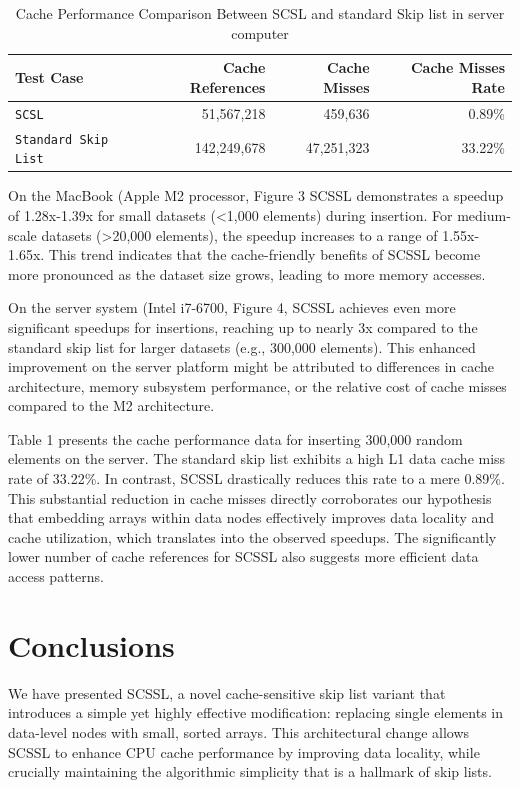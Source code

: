 \documentclass[sigconf, nonacm, letterpaper,top=2cm,bottom=2cm,left=3cm,right=3cm,marginparwidth=1.75cm]{acmart}
\begin{document}
\begin{table}[t]
\begin{tabular}{lrrr}
\toprule
Test Case & Cache References & Cache Misses & Cache Misses Rate \\
\midrule
\verb|SCSL| & 51,567,218 & 459,636 & 0.89\% \\
\verb|Standard Skip List| & 142,249,678 & 47,251,323 & 33.22\% \\
\bottomrule
\end{tabular}
\caption{Cache Performance Comparison Between SCSL and standard Skip list in server computer}
\end{table}


On the MacBook (Apple M2 processor, Figure 3 SCSSL demonstrates a speedup of 1.28x-1.39x for small datasets (<1,000 elements) during insertion. For medium-scale datasets (>20,000 elements), the speedup increases to a range of 1.55x-1.65x. This trend indicates that the cache-friendly benefits of SCSSL become more pronounced as the dataset size grows, leading to more memory accesses.

On the server system (Intel i7-6700, Figure 4, SCSSL achieves even more significant speedups for insertions, reaching up to nearly 3x compared to the standard skip list for larger datasets (e.g., 300,000 elements). This enhanced improvement on the server platform might be attributed to differences in cache architecture, memory subsystem performance, or the relative cost of cache misses compared to the M2 architecture.




Table 1 presents the cache performance data for inserting 300,000 random elements on the server. The standard skip list exhibits a high L1 data cache miss rate of 33.22\%. In contrast, SCSSL drastically reduces this rate to a mere 0.89\%. This substantial reduction in cache misses directly corroborates our hypothesis that embedding arrays within data nodes effectively improves data locality and cache utilization, which translates into the observed speedups. The significantly lower number of cache references for SCSSL also suggests more efficient data access patterns.



\section{Conclusions}

We have presented SCSSL, a novel cache-sensitive skip list variant that introduces a simple yet highly effective modification: replacing single elements in data-level nodes with small, sorted arrays. This architectural change allows SCSSL to enhance CPU cache performance by improving data locality, while crucially maintaining the algorithmic simplicity that is a hallmark of skip lists.
\end{document}
